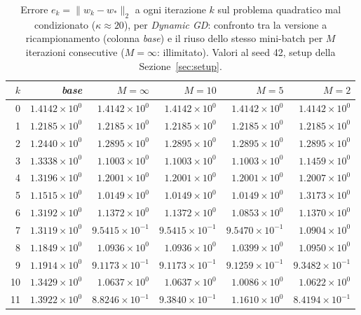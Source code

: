 \begin{table}[H]
\centering
\footnotesize
\renewcommand{\arraystretch}{0.85}
\setlength{\tabcolsep}{4pt}
\caption{Errore $e_k=\|w_k-w_*\|_2$ a ogni iterazione $k$ sul problema quadratico mal condizionato ($\kappa\approx 20$), per \emph{Dynamic GD}: confronto tra la versione a ricampionamento (colonna \emph{base}) e il riuso dello stesso mini-batch per $M$ iterazioni consecutive ($M=\infty$: illimitato). Valori al seed 42, setup della Sezione~\ref{sec:setup}.}
\label{tab:riuso_malcond_gd}
\begin{tabular}{@{}rrrrrr@{}}
\toprule
$k$ & \emph{base} & $M{=}\infty$ & $M{=}10$ & $M{=}5$ & $M{=}2$\\
\midrule
0 & $1.4142\times10^{0}$ & $1.4142\times10^{0}$ & $1.4142\times10^{0}$ & $1.4142\times10^{0}$ & $1.4142\times10^{0}$\\
1 & $1.2185\times10^{0}$ & $1.2185\times10^{0}$ & $1.2185\times10^{0}$ & $1.2185\times10^{0}$ & $1.2185\times10^{0}$\\
2 & $1.2440\times10^{0}$ & $1.2895\times10^{0}$ & $1.2895\times10^{0}$ & $1.2895\times10^{0}$ & $1.2895\times10^{0}$\\
3 & $1.3338\times10^{0}$ & $1.1003\times10^{0}$ & $1.1003\times10^{0}$ & $1.1003\times10^{0}$ & $1.1459\times10^{0}$\\
4 & $1.3196\times10^{0}$ & $1.2001\times10^{0}$ & $1.2001\times10^{0}$ & $1.2001\times10^{0}$ & $1.2007\times10^{0}$\\
5 & $1.1515\times10^{0}$ & $1.0149\times10^{0}$ & $1.0149\times10^{0}$ & $1.0149\times10^{0}$ & $1.3173\times10^{0}$\\
6 & $1.3192\times10^{0}$ & $1.1372\times10^{0}$ & $1.1372\times10^{0}$ & $1.0853\times10^{0}$ & $1.1370\times10^{0}$\\
7 & $1.3119\times10^{0}$ & $9.5415\times10^{-1}$ & $9.5415\times10^{-1}$ & $9.5470\times10^{-1}$ & $1.0904\times10^{0}$\\
8 & $1.1849\times10^{0}$ & $1.0936\times10^{0}$ & $1.0936\times10^{0}$ & $1.0399\times10^{0}$ & $1.0950\times10^{0}$\\
9 & $1.1914\times10^{0}$ & $9.1173\times10^{-1}$ & $9.1173\times10^{-1}$ & $9.1259\times10^{-1}$ & $9.3482\times10^{-1}$\\
10 & $1.3429\times10^{0}$ & $1.0637\times10^{0}$ & $1.0637\times10^{0}$ & $1.0086\times10^{0}$ & $1.0622\times10^{0}$\\
11 & $1.3922\times10^{0}$ & $8.8246\times10^{-1}$ & $9.3840\times10^{-1}$ & $1.1610\times10^{0}$ & $8.4194\times10^{-1}$\\

\end{tabular}
\end{table}
